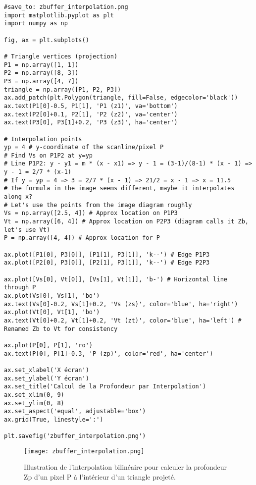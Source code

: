\documentclass{article}
\begin{document}
\begin{verbatim}
#save_to: zbuffer_interpolation.png
import matplotlib.pyplot as plt
import numpy as np

fig, ax = plt.subplots()

# Triangle vertices (projection)
P1 = np.array([1, 1])
P2 = np.array([8, 3])
P3 = np.array([4, 7])
triangle = np.array([P1, P2, P3])
ax.add_patch(plt.Polygon(triangle, fill=False, edgecolor='black'))
ax.text(P1[0]-0.5, P1[1], 'P1 (z1)', va='bottom')
ax.text(P2[0]+0.1, P2[1], 'P2 (z2)', va='center')
ax.text(P3[0], P3[1]+0.2, 'P3 (z3)', ha='center')

# Interpolation points
yp = 4 # y-coordinate of the scanline/pixel P
# Find Vs on P1P2 at y=yp
# Line P1P2: y - y1 = m * (x - x1) => y - 1 = (3-1)/(8-1) * (x - 1) => y - 1 = 2/7 * (x-1)
# If y = yp = 4 => 3 = 2/7 * (x - 1) => 21/2 = x - 1 => x = 11.5
# The formula in the image seems different, maybe it interpolates along x?
# Let's use the points from the image diagram roughly
Vs = np.array([2.5, 4]) # Approx location on P1P3
Vt = np.array([6, 4]) # Approx location on P2P3 (diagram calls it Zb, let's use Vt)
P = np.array([4, 4]) # Approx location for P

ax.plot([P1[0], P3[0]], [P1[1], P3[1]], 'k--') # Edge P1P3
ax.plot([P2[0], P3[0]], [P2[1], P3[1]], 'k--') # Edge P2P3

ax.plot([Vs[0], Vt[0]], [Vs[1], Vt[1]], 'b-') # Horizontal line through P
ax.plot(Vs[0], Vs[1], 'bo')
ax.text(Vs[0]-0.2, Vs[1]+0.2, 'Vs (zs)', color='blue', ha='right')
ax.plot(Vt[0], Vt[1], 'bo')
ax.text(Vt[0]+0.2, Vt[1]+0.2, 'Vt (zt)', color='blue', ha='left') # Renamed Zb to Vt for consistency

ax.plot(P[0], P[1], 'ro')
ax.text(P[0], P[1]-0.3, 'P (zp)', color='red', ha='center')

ax.set_xlabel('X écran')
ax.set_ylabel('Y écran')
ax.set_title('Calcul de la Profondeur par Interpolation')
ax.set_xlim(0, 9)
ax.set_ylim(0, 8)
ax.set_aspect('equal', adjustable='box')
ax.grid(True, linestyle=':')

plt.savefig('zbuffer_interpolation.png')
\end{verbatim}

\begin{figure}[H]
\centering
\texttt{[image: zbuffer\_interpolation.png]}
\caption{Illustration de l'interpolation bilinéaire pour calculer la profondeur Zp d'un pixel P à l'intérieur d'un triangle projeté.}
\label{fig:zbuffer_interpolation}
\end{figure}
\end{document}
